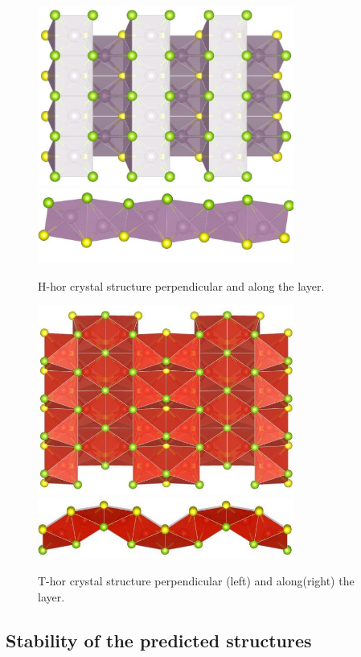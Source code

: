 \documentclass[a4paperm]{article}
\begin{document}
\begin{figure}[H]
	\includegraphics[width=0.75\textwidth]{H_hor_1.jpg} \\
	\includegraphics[width=0.75\textwidth]{H_hor_2.jpg}
	\caption{H-hor crystal structure perpendicular and along the layer.}
\label{H_hor}
\end{figure} 


\begin{figure}[H]
        \includegraphics[width=0.75\textwidth]{T_hor_1.jpg} \\
        \includegraphics[width=0.75\textwidth]{T_hor_2.jpg}
        \caption{T-hor crystal structure perpendicular (left) and along(right) the layer.}
\label{T_hor}
\end{figure}



\subsection{Stability of the predicted structures}
\end{document}
